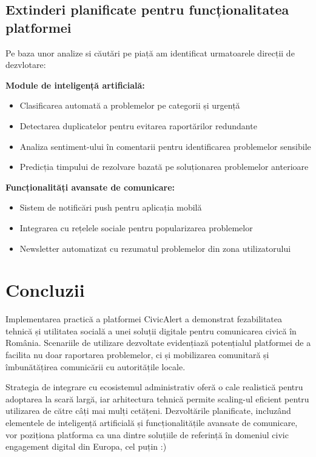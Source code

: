 \documentclass[12pt,a4paper]{report}
\begin{document}
\subsection{Extinderi planificate pentru funcționalitatea platformei}

Pe baza unor analize si căutări pe piață am identificat urmatoarele direcții de dezvlotare:

\textbf{Module de inteligență artificială:}
\begin{itemize}
\item Clasificarea automată a problemelor pe categorii și urgență
\item Detectarea duplicatelor pentru evitarea raportărilor redundante
\item Analiza sentiment-ului în comentarii pentru identificarea problemelor sensibile
\item Predicția timpului de rezolvare bazată pe soluționarea problemelor anterioare
\end{itemize}

\textbf{Funcționalități avansate de comunicare:}
\begin{itemize}
\item Sistem de notificări push pentru aplicația mobilă
\item Integrarea cu rețelele sociale pentru popularizarea problemelor
\item Newsletter automatizat cu rezumatul problemelor din zona utilizatorului
\end{itemize}

\section{Concluzii}

Implementarea practică a platformei CivicAlert a demonstrat fezabilitatea tehnică și utilitatea socială a unei soluții digitale pentru comunicarea civică în România. Scenariile de utilizare dezvoltate evidențiază potențialul platformei de a facilita nu doar raportarea problemelor, ci și mobilizarea comunitară și îmbunătățirea comunicării cu autoritățile locale.

Strategia de integrare  cu ecosistemul administrativ oferă o cale realistică pentru adoptarea la scară largă, iar arhitectura tehnică permite scaling-ul eficient pentru utilizarea de către câți mai mulți cetățeni. Dezvoltările planificate, incluzând elementele de inteligență artificială și funcționalitățile avansate de comunicare, vor poziționa platforma ca una dintre soluțiile de referință în domeniul civic engagement digital din Europa, cel puțin :) 
\newpage
\end{document}
